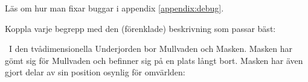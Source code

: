 
\ifPreSolution


\Exercise{\ExeWeekFOUR}\label{exe:W04}
\begin{Goals}

\end{Goals}

\begin{Preparations}
\item {}
\item Läs om hur man fixar buggar i appendix \ref{appendix:debug}.
\end{Preparations}

\else

\ExerciseSolution{\ExeWeekFOUR}

\fi



\BasicTasks %



\QUESTBEGIN

\Task \what

\vspace{1em}\noindent Koppla varje begrepp med den (förenklade) beskrivning som passar bäst:

\begin{ConceptConnections}

\end{ConceptConnections}

\SOLUTION

\TaskSolved \what

\begin{ConceptConnections}

\end{ConceptConnections}

\QUESTEND





\QUESTBEGIN

\Task \what~I den tvådimensionella Underjorden bor Mullvaden och Masken. Masken har gömt sig för Mullvaden och befinner sig på en plats långt bort. Masken har även gjort delar av sin position osynlig för omvärlden:


